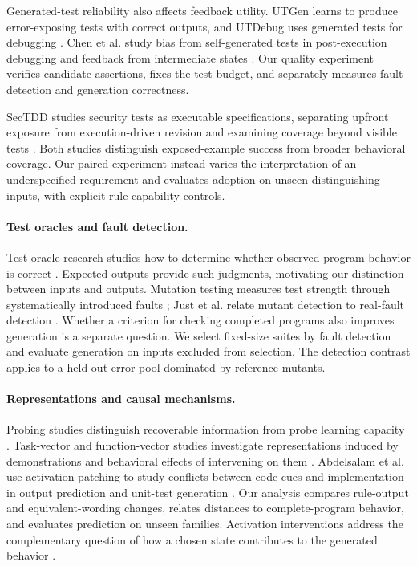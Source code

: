 \documentclass[acmsmall,screen,review,anonymous]{acmart}
\begin{document}
Generated-test reliability also affects feedback utility.
UTGen learns to produce error-exposing tests with correct outputs, and UTDebug uses generated tests for debugging \citep{prasad2025utgen}.
Chen et al. study bias from self-generated tests in post-execution debugging and feedback from intermediate states \citep{chen2025revisit}.
Our quality experiment verifies candidate assertions, fixes the test budget, and separately measures fault detection and generation correctness.

SecTDD studies security tests as executable specifications, separating upfront exposure from execution-driven revision and examining coverage beyond visible tests \citep{liang2026sectdd}.
Both studies distinguish exposed-example success from broader behavioral coverage.
Our paired experiment instead varies the interpretation of an underspecified requirement and evaluates adoption on unseen distinguishing inputs, with explicit-rule capability controls.

\paragraph{Test oracles and fault detection.}
Test-oracle research studies how to determine whether observed program behavior is correct \citep{barr2015oracle}.
Expected outputs provide such judgments, motivating our distinction between inputs and outputs.
Mutation testing measures test strength through systematically introduced faults \citep{jia2011mutation}; Just et al. relate mutant detection to real-fault detection \citep{just2014mutants}.
Whether a criterion for checking completed programs also improves generation is a separate question.
We select fixed-size suites by fault detection and evaluate generation on inputs excluded from selection.
The detection contrast applies to a held-out error pool dominated by reference mutants.

\paragraph{Representations and causal mechanisms.}
Probing studies distinguish recoverable information from probe learning capacity \citep{hewitt2019probes}.
Task-vector and function-vector studies investigate representations induced by demonstrations and behavioral effects of intervening on them \citep{hendel2023taskvectors,todd2024function}.
Abdelsalam et al. use activation patching to study conflicts between code cues and implementation in output prediction and unit-test generation \citep{abdelsalam2026conflicts}.
Our analysis compares rule-output and equivalent-wording changes, relates distances to complete-program behavior, and evaluates prediction on unseen families.
Activation interventions address the complementary question of how a chosen state contributes to the generated behavior \citep{heimersheim2024patching}.
\end{document}
